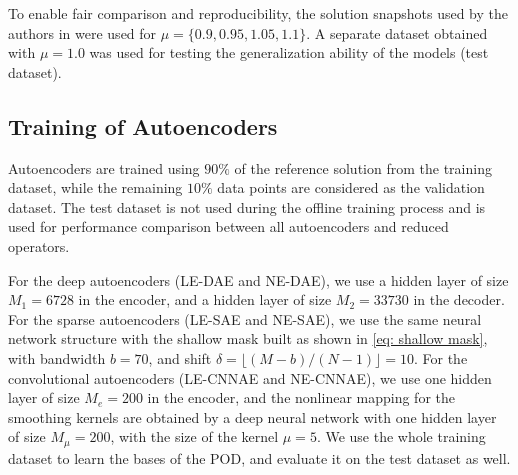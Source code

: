 To enable fair comparison and reproducibility, the solution snapshots used by the authors in \cite{kim2022fast} were used for $\mu = \{0.9, 0.95, 1.05, 1.1\}$.  A separate dataset obtained with $\mu = 1.0$ was used for testing the generalization ability of the models (test dataset).

\subsection{Training of Autoencoders}

Autoencoders are trained using $90\%$ of the reference solution from the training dataset, while the remaining $10\%$ data points are considered as the validation dataset. The test dataset is not used during the offline training process and is used for performance comparison between all autoencoders and reduced operators.

For the deep autoencoders (LE-DAE and NE-DAE), we use a hidden layer of size $M_1 = 6728$ in the encoder, and a hidden layer of size $M_2 = 33730$ in the decoder. For the sparse autoencoders (LE-SAE and NE-SAE), we use the same neural network structure with the shallow mask built as shown in \eqref{eq: shallow mask}, with bandwidth $b = 70$, and shift $\delta = \lfloor (M - b) / (N - 1) \rfloor = 10$. For the convolutional autoencoders (LE-CNNAE and NE-CNNAE), we use one hidden layer of size $M_e = 200$ in the encoder, and the nonlinear mapping for the smoothing kernels are obtained by a deep neural network with one hidden layer of size $M_{\mu} = 200$, with the size of the kernel $\mu = 5$. We use the whole training dataset to learn the bases of the POD, and evaluate it on the test dataset as well.

